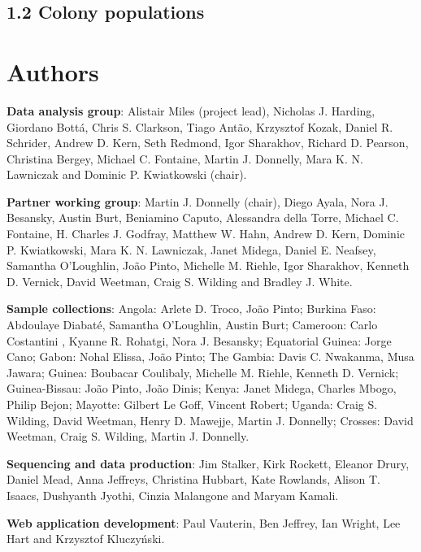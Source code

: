 \documentclass[a4paper,11pt,abstracton,hidelinks]{scrartcl}
\begin{document}
\subsection*{1.2 Colony populations}

\section*{Authors}

%
\textbf{Data analysis group}: Alistair Miles (project lead), Nicholas J. Harding, Giordano Bott\'{a}, Chris S. Clarkson, Tiago Ant\~{a}o, Krzysztof Kozak, Daniel R. Schrider, Andrew D. Kern, Seth Redmond, Igor Sharakhov, Richard D. Pearson, Christina Bergey, Michael C. Fontaine, Martin J. Donnelly, Mara K. N. Lawniczak and Dominic P. Kwiatkowski (chair).

%
\textbf{Partner working group}: Martin J. Donnelly (chair), Diego Ayala, Nora J. Besansky, Austin Burt, Beniamino Caputo, Alessandra della Torre, Michael C. Fontaine, H. Charles J. Godfray, Matthew W. Hahn, Andrew D. Kern, Dominic P. Kwiatkowski, Mara K. N. Lawniczak, Janet Midega, Daniel E. Neafsey, Samantha O'Loughlin, Jo\~{a}o Pinto, Michelle M. Riehle, Igor Sharakhov, Kenneth D. Vernick, David Weetman, Craig S. Wilding and Bradley J. White.

%
\textbf{Sample collections}: Angola: Arlete D. Troco, Jo\~{a}o Pinto; Burkina Faso: Abdoulaye Diabat\'{e}, Samantha O'Loughlin, Austin Burt; Cameroon: Carlo Costantini , Kyanne R. Rohatgi, Nora J. Besansky; Equatorial Guinea: Jorge Cano; Gabon: Nohal Elissa, Jo\~{a}o Pinto; The Gambia: Davis C. Nwakanma, Musa Jawara; Guinea: Boubacar Coulibaly, Michelle M. Riehle, Kenneth D. Vernick; Guinea-Bissau: Jo\~{a}o Pinto, Jo\~{a}o Dinis; Kenya: Janet Midega, Charles Mbogo, Philip Bejon; Mayotte: Gilbert Le Goff, Vincent Robert; Uganda: Craig S. Wilding, David Weetman, Henry D. Mawejje, Martin J. Donnelly; Crosses: David Weetman, Craig S. Wilding, Martin J. Donnelly.

%
\textbf{Sequencing and data production}: Jim Stalker, Kirk Rockett, Eleanor Drury, Daniel Mead, Anna Jeffreys, Christina Hubbart, Kate Rowlands, Alison T. Isaacs, Dushyanth Jyothi, Cinzia Malangone and Maryam Kamali.

%
\textbf{Web application development}: Paul Vauterin, Ben Jeffrey, Ian Wright, Lee Hart and Krzysztof Kluczy\'{n}ski.
\end{document}
